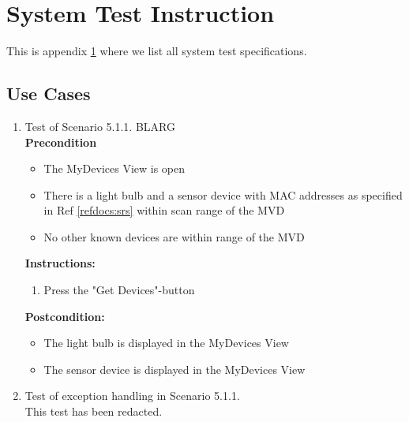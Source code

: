 \documentclass[a4paper]{article}
\newlength{\testlabellength}
\newenvironment{testlist}{\begin{enumerate}[label=\bfseries Instruction \thesubsection.\arabic* , labelindent=0pt, labelwidth=\testlabellength , leftmargin=2cm]}{\end{enumerate}}
\newenvironment{precondition}{
{\color{white}BLARG}\\ 
\textbf{Precondition}
\begin{itemize}[labelindent=0cm, labelwidth=2cm , leftmargin=1cm]
}
{\end{itemize}}
\newenvironment{instruction}{
\textbf{Instructions:}
\begin{enumerate}[label=\bfseries  \arabic*., labelindent=0cm, labelwidth=2cm , leftmargin=1cm]
}
{\end{enumerate}}
\newenvironment{postcondition}{
\textbf{Postcondition:}
\begin{itemize}[labelindent=0cm, labelwidth=2cm , leftmargin=1cm]
}
{\end{itemize}}
\begin{document}
\begin{appendices}
\begin{testlist}
\end{testlist}	

\newpage

\section{System Test Instruction} \label{appendix:section:systemtest}
This is appendix \ref{appendix:section:systemtest} where we list all system test specifications.

\subsection{Use Cases}
\begin{testlist}
	\item Test of Scenario 5.1.1.
		\begin{precondition}
			\item The MyDevices View is open
			\item There is a light bulb and a sensor device with MAC addresses as specified in Ref \ref{refdocs:srs} within scan range of the MVD
			\item No other known devices are within range of the MVD
		\end{precondition}
		\begin{instruction}
			\item Press the "Get Devices"-button
		\end{instruction}
		\begin{postcondition}
			\item The light bulb is displayed in the MyDevices View
		 	\item The sensor device is displayed in the MyDevices View
		\end{postcondition}

	\item Test of exception handling in Scenario 5.1.1. \\
	This test has been redacted.
	

\end{testlist}
\end{appendices}
\end{document}
